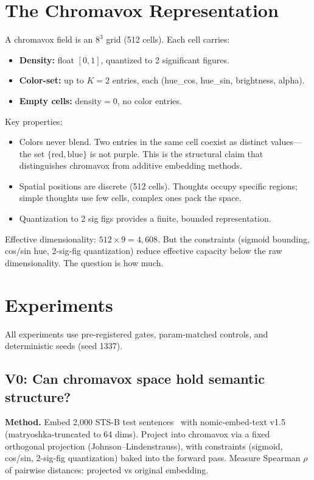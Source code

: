 \documentclass[11pt,a4paper]{article}
\begin{document}
\section{The Chromavox Representation}

A chromavox field is an $8^3$ grid (512 cells). Each cell carries:
\begin{itemize}
\item \textbf{Density:} float $[0,1]$, quantized to 2 significant figures.
\item \textbf{Color-set:} up to $K{=}2$ entries, each (hue\_cos, hue\_sin, brightness, alpha).
\item \textbf{Empty cells:} density$=0$, no color entries.
\end{itemize}

Key properties:
\begin{itemize}
\item Colors never blend. Two entries in the same cell coexist as distinct values---the set $\{\text{red}, \text{blue}\}$ is not purple. This is the structural claim that distinguishes chromavox from additive embedding methods.
\item Spatial positions are discrete (512 cells). Thoughts occupy specific regions; simple thoughts use few cells, complex ones pack the space.
\item Quantization to 2 sig figs provides a finite, bounded representation.
\end{itemize}

Effective dimensionality: $512 \times 9 = 4{,}608$. But the constraints (sigmoid bounding, cos/sin hue, 2-sig-fig quantization) reduce effective capacity below the raw dimensionality. The question is how much.

\section{Experiments}

All experiments use pre-registered gates, param-matched controls, and deterministic seeds (seed 1337).

\subsection{V0: Can chromavox space hold semantic structure?}

\textbf{Method.} Embed 2,000 STS-B test sentences~\cite{stsb} with nomic-embed-text v1.5 (matryoshka-truncated to 64 dims). Project into chromavox via a fixed orthogonal projection (Johnson--Lindenstrauss), with constraints (sigmoid, cos/sin, 2-sig-fig quantization) baked into the forward pass. Measure Spearman $\rho$ of pairwise distances: projected vs original embedding.
\end{document}
